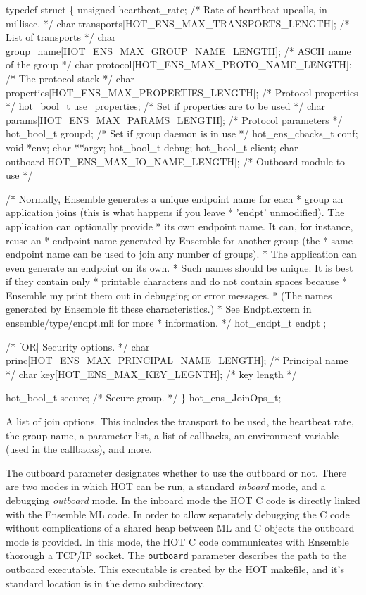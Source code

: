 \begin{codebox}
typedef struct \{
    unsigned heartbeat_rate;	/* Rate of heartbeat upcalls, in millisec. */
    char transports[HOT_ENS_MAX_TRANSPORTS_LENGTH]; /* List of transports */
    char group_name[HOT_ENS_MAX_GROUP_NAME_LENGTH]; /* ASCII name of the group */
    char protocol[HOT_ENS_MAX_PROTO_NAME_LENGTH]; /* The protocol stack */
    char properties[HOT_ENS_MAX_PROPERTIES_LENGTH]; /* Protocol properties */
    hot_bool_t use_properties;		/* Set if properties are to be used */
    char params[HOT_ENS_MAX_PARAMS_LENGTH]; /* Protocol parameters */
    hot_bool_t groupd;			/* Set if group daemon is in use */
    hot_ens_cbacks_t conf;
    void *env;
    char **argv;
    hot_bool_t debug;
    hot_bool_t client;
    char outboard[HOT_ENS_MAX_IO_NAME_LENGTH]; /* Outboard module to use */

    /* Normally, Ensemble generates a unique endpoint name for each
     * group an application joins (this is what happens if you leave
     * 'endpt' unmodified).  The application can optionally provide
     * its own endpoint name.  It can, for instance, reuse an
     * endpoint name generated by Ensemble for another group (the
     * same endpoint name can be used to join any number of groups).
     * The application can even generate an endpoint on its own.
     * Such names should be unique.  It is best if they contain only
     * printable characters and do not contain spaces because
     * Ensemble my print them out in debugging or error messages.
     * (The names generated by Ensemble fit these characteristics.)
     * See Endpt.extern in ensemble/type/endpt.mli for more
     * information.
     */
    hot_endpt_t endpt ;

    /* [OR] Security options. 
     */
    char princ[HOT_ENS_MAX_PRINCIPAL_NAME_LENGTH]; /* Principal name */
    char key[HOT_ENS_MAX_KEY_LEGNTH];             /* key length */

    hot_bool_t secure;                      /* Secure group. */
\} hot_ens_JoinOps_t;
\end{codebox}
A list of join options. This includes the transport to be used, the
heartbeat rate, the group name, a parameter list, a list of callbacks,
an environment variable (used in the callbacks), and more. 

The outboard parameter designates whether to use the outboard or not. 
There are two modes in which HOT can be run, a standard {\it inboard} mode,
and a debugging {\it outboard} mode. In the inboard mode the HOT C
code is directly linked with the Ensemble ML code. In order to allow
separately debugging the C code without complications of a shared heap
between ML and C objects the outboard mode is provided. In this mode,
the HOT C code communicates with Ensemble thorough a TCP/IP
socket. The {\tt outboard} parameter describes the path to the
outboard executable. This executable is created by the HOT makefile,
and it's standard location is in the demo subdirectory.

